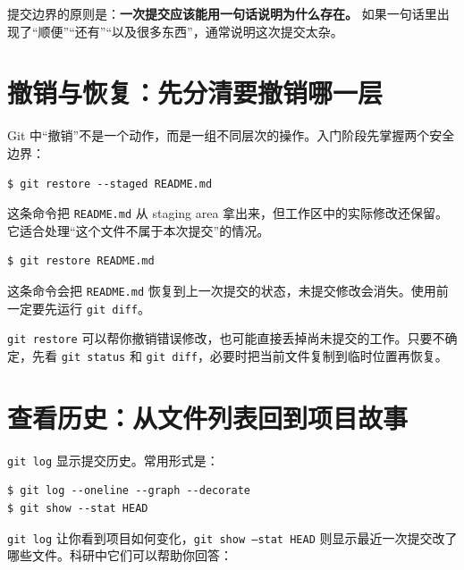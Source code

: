 提交边界的原则是：\textbf{一次提交应该能用一句话说明为什么存在。} 如果一句话里出现了“顺便”“还有”“以及很多东西”，通常说明这次提交太杂。

\section{撤销与恢复：先分清要撤销哪一层}

Git 中“撤销”不是一个动作，而是一组不同层次的操作。入门阶段先掌握两个安全边界：

\begin{examplebox}[取消暂存但保留文件内容]
\begin{lstlisting}[style=terminal]
$ git restore --staged README.md
\end{lstlisting}
\end{examplebox}

这条命令把 \texttt{README.md} 从 staging area 拿出来，但工作区中的实际修改还保留。它适合处理“这个文件不属于本次提交”的情况。

\begin{examplebox}[丢弃工作区修改]
\begin{lstlisting}[style=terminal]
$ git restore README.md
\end{lstlisting}
\end{examplebox}

这条命令会把 \texttt{README.md} 恢复到上一次提交的状态，未提交修改会消失。使用前一定要先运行 \texttt{git diff}。

\begin{warnbox}[恢复命令不是回收站]
\texttt{git restore} 可以帮你撤销错误修改，也可能直接丢掉尚未提交的工作。只要不确定，先看 \texttt{git status} 和 \texttt{git diff}，必要时把当前文件复制到临时位置再恢复。
\end{warnbox}

\section{查看历史：从文件列表回到项目故事}

\texttt{git log} 显示提交历史。常用形式是：

\begin{examplebox}[查看紧凑历史]
\begin{lstlisting}[style=terminal]
$ git log --oneline --graph --decorate
$ git show --stat HEAD
\end{lstlisting}
\end{examplebox}

\texttt{git log} 让你看到项目如何变化，\texttt{git show --stat HEAD} 则显示最近一次提交改了哪些文件。科研中它们可以帮助你回答：

